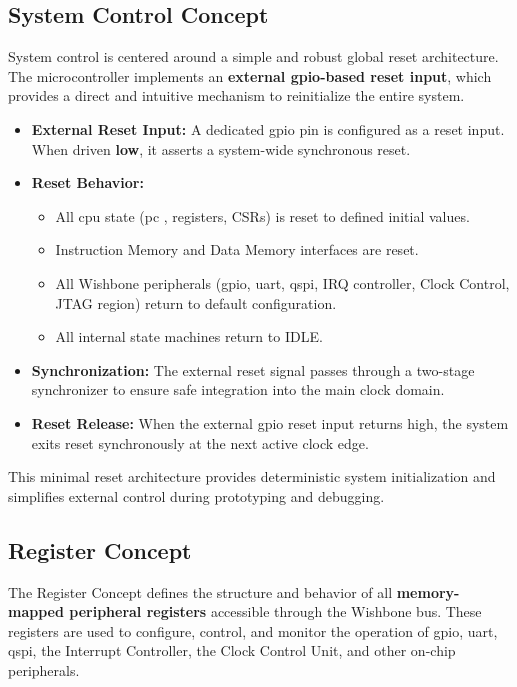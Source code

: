 \subsection{System Control Concept}
System control is centered around a simple and robust global reset architecture.  
The microcontroller implements an \textbf{external \gls{gpio}-based reset input}, which provides a direct and intuitive 
mechanism to reinitialize the entire system.

\begin{itemize}
    \item \textbf{External Reset Input:}  
          A dedicated \gls{gpio} pin is configured as a reset input. When driven \textbf{low}, it asserts a 
          system-wide synchronous reset.

    \item \textbf{Reset Behavior:}
          \begin{itemize}
              \item All \gls{cpu} state (\gls{pc} , registers, CSRs) is reset to defined initial v\gls{alu}es.
              \item Instruction Memory and Data Memory interfaces are reset.
              \item All Wishbone peripherals (\gls{gpio}, \gls{uart}, \gls{qspi}, \gls{IRQ} controller, Clock Control, JTAG region) 
                    return to default configuration.
              \item All internal state machines return to IDLE.
          \end{itemize}

    \item \textbf{Synchronization:}  
          The external reset signal passes through a two-stage synchronizer to ensure safe integration into the 
          main clock domain.

    \item \textbf{Reset Release:}  
          When the external \gls{gpio} reset input returns high, the system exits reset synchronously at the next 
          active clock edge.

\end{itemize}

This minimal reset architecture provides deterministic system initialization and simplifies external control 
during prototyping and debugging.

\subsection{Register Concept}
The Register Concept defines the structure and behavior of all \textbf{memory-mapped peripheral registers} 
accessible through the Wishbone bus. These registers are used to configure, control, and monitor the operation 
of \gls{gpio}, \gls{uart}, \gls{qspi}, the Interrupt Controller, the Clock Control Unit, and other on-chip peripherals.


